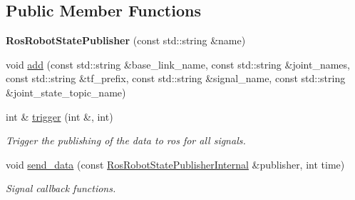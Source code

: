 \subsection*{Public Member Functions}
\begin{DoxyCompactItemize}
\item 
{\bfseries Ros\+Robot\+State\+Publisher} (const std\+::string \&name)\hypertarget{classdynamic__graph_1_1RosRobotStatePublisher_a7dbda339acfbacd6c2f45e7aac4409be}{}\label{classdynamic__graph_1_1RosRobotStatePublisher_a7dbda339acfbacd6c2f45e7aac4409be}

\item 
void \hyperlink{classdynamic__graph_1_1RosRobotStatePublisher_a92094934e53306e73b6fc13d1de61b3d}{add} (const std\+::string \&base\+\_\+link\+\_\+name, const std\+::string \&joint\+\_\+names, const std\+::string \&tf\+\_\+prefix, const std\+::string \&signal\+\_\+name, const std\+::string \&joint\+\_\+state\+\_\+topic\+\_\+name)
\item 
int \& \hyperlink{classdynamic__graph_1_1RosRobotStatePublisher_a4d66defbd1b308cd06394107f55f6cbb}{trigger} (int \&, int)
\begin{DoxyCompactList}\small\item\em Trigger the publishing of the data to ros for all signals. \end{DoxyCompactList}\item 
void \hyperlink{classdynamic__graph_1_1RosRobotStatePublisher_a196621509ce1e5becada60a7093bcb3a}{send\+\_\+data} (const \hyperlink{structdynamic__graph_1_1RosRobotStatePublisherInternal}{Ros\+Robot\+State\+Publisher\+Internal} \&publisher, int time)\hypertarget{classdynamic__graph_1_1RosRobotStatePublisher_a196621509ce1e5becada60a7093bcb3a}{}\label{classdynamic__graph_1_1RosRobotStatePublisher_a196621509ce1e5becada60a7093bcb3a}

\begin{DoxyCompactList}\small\item\em Signal callback functions. \end{DoxyCompactList}\end{DoxyCompactItemize}
